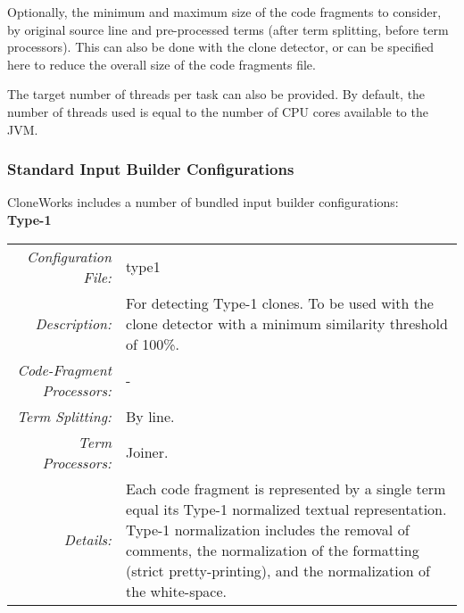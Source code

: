 \documentclass[]{article}
\begin{document}
	Optionally, the minimum and maximum size of the code fragments to consider, by original source line and pre-processed terms (after term splitting, before term processors).  This can also be done with the clone detector, or can be specified here to reduce the overall size of the code fragments file.
	
	The target number of threads per task can also be provided.  By default, the number of threads used is equal to the number of CPU cores available to the JVM.
		
	 	\subsubsection{Standard Input Builder Configurations}
		CloneWorks includes a number of bundled input builder configurations:\\
		
		\noindent \textbf{Type-1}\\
		\begin{tabular}{rp{12.5cm}}
		\bottomrule[2pt]
			\textit{Configuration File:} & type1 \\
			\textit{Description:}       & For detecting Type-1 clones.  To be used with the clone detector with a minimum similarity threshold of 100\%. \\
		\midrule
			\textit{Code-Fragment Processors:} & - \\
			\textit{Term Splitting:}  & By line.\\
			\textit{Term Processors:} & Joiner.\\
		\midrule
			\textit{Details:}         & Each code fragment is represented by a single term equal its Type-1 normalized textual representation.  Type-1 normalization includes the removal of comments, the normalization of the formatting (strict pretty-printing), and the normalization of the white-space.\\
		\bottomrule[2pt]
		\end{tabular} \\\\
		
\end{document}
